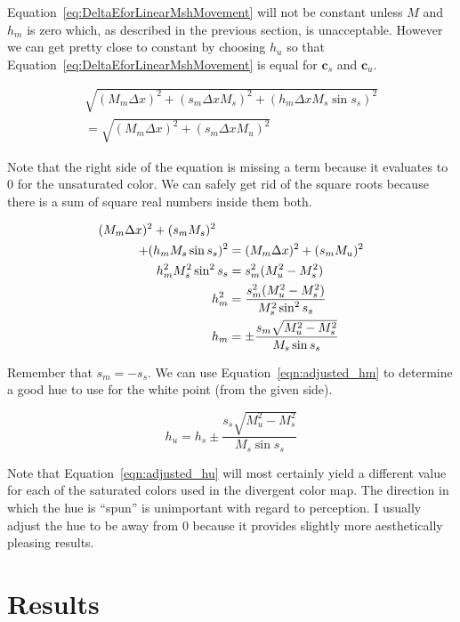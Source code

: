 \documentclass[twocolumn]{article}
\newcommand*{\cvec}[1]{\mathbf{#1}}
\begin{document}
Equation~\ref{eq:DeltaEforLinearMshMovement} will not be constant unless
$M$ and $h_m$ is zero which, as described in the previous section, is
unacceptable.  However we can get pretty close to constant by choosing
$h_u$ so that Equation~\ref{eq:DeltaEforLinearMshMovement} is equal for
$\cvec{c}_s$ and $\cvec{c}_u$.

\begin{multline*}
  \sqrt{(M_m \Delta x)^2 + (s_m \Delta x M_s)^2 + (h_m \Delta x M_s \sin s_s)^2}
  \\ =
  \sqrt{(M_m \Delta x)^2 + (s_m \Delta x M_u)^2}
\end{multline*}

Note that the right side of the equation is missing a term because it
evaluates to 0 for the unsaturated color.  We can safely get rid of the
square roots because there is a sum of square real numbers inside them
both.

\begin{align}
    (M_m \Delta x)^2 + (s_m M_s)^2 \quad & \notag \\
    + (h_m M_s \sin s_s)^2 &= (M_m \Delta x)^2 + (s_m M_u)^2 \notag \\
    h_m^2 M_s^2 \sin^2 s_s &= s_m^2 (M_u^2 - M_s^2) \notag \\
    h_m^2 &= \frac{s_m^2 (M_u^2 - M_s^2)}{M_s^2 \sin^2 s_s} \notag \\
    h_m &= \pm \frac{s_m \sqrt{M_u^2 - M_s^2}}{M_s \sin s_s}
    \label{eqn:adjusted_hm}
\end{align}

Remember that $s_m=-s_s$.  We can use Equation~\ref{eqn:adjusted_hm} to
determine a good hue to use for the white point (from the given side).

\begin{equation}
  h_u = h_s \pm \frac{s_s \sqrt{M_u^2 - M_s^2}}{M_s \sin s_s}
  \label{eqn:adjusted_hu}
\end{equation}

Note that Equation~\ref{eqn:adjusted_hu} will most certainly yield a
different value for each of the saturated colors used in the divergent
color map.  The direction in which the hue is ``spun'' is unimportant with
regard to perception.  I usually adjust the hue to be away from 0 because
it provides slightly more aesthetically pleasing results.


\section{Results}
\label{sec:Results}
\end{document}
